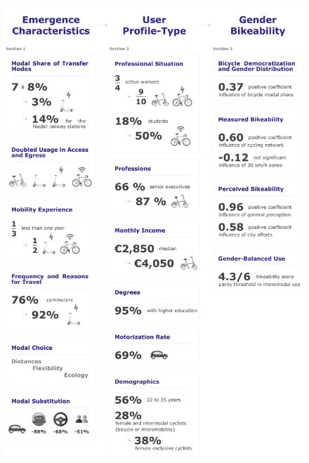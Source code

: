 \begin{refsegment}
\begin{figure}[h!]\vspace*{4pt}
        \caption*{}
        \label{graphical-abstract-chap4}
        \centerline{\includegraphics[width=1\columnwidth]{src/Figures/Graphical-abstract/EN_Graphical_abstract_chap4.pdf}}
        \vspace{5pt}
    \end{figure}


\end{refsegment}
